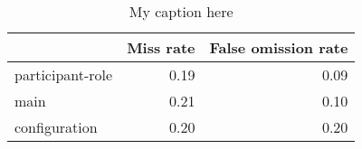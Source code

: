 \begin{table}[!ht]
\centering
\begin{tabular}{lrr}
\toprule
{} &  Miss rate &  False omission rate \\
\midrule
participant-role &       0.19 &                 0.09 \\
main             &       0.21 &                 0.10 \\
configuration    &       0.20 &                 0.20 \\
\bottomrule
\end{tabular}
\caption{My caption here}
\label{tab:unit-elements-transitivity-exact-errors}
\end{table}